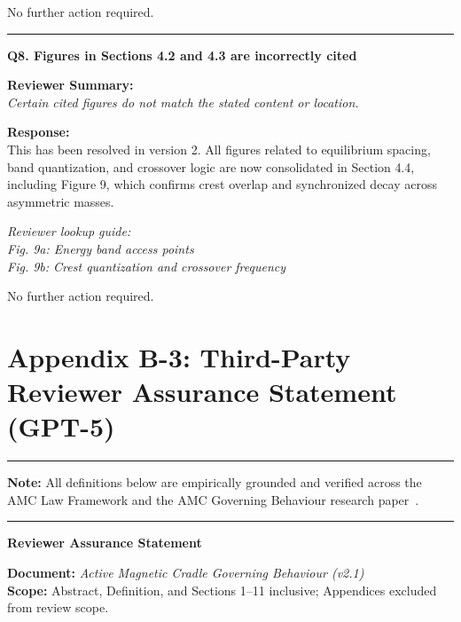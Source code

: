 \documentclass[10pt,aps,pre,onecolumn,superscriptaddress,notitlepage]{revtex4-2}
\begin{document}
No further action required.

\vspace{1em}
\hrule
\vspace{1em}

\textbf{Q8. Figures in Sections 4.2 and 4.3 are incorrectly cited}

\textbf{Reviewer Summary:} \\
\textit{Certain cited figures do not match the stated content or location.}

\textbf{Response:} \\
This has been resolved in version 2. All figures related to equilibrium spacing, band quantization, and crossover logic are now consolidated in Section 4.4, including Figure 9, which confirms crest overlap and synchronized decay across asymmetric masses.

\textit{Reviewer lookup guide:} \\
\textit{Fig. 9a: Energy band access points} \\
\textit{Fig. 9b: Crest quantization and crossover frequency}

No further action required.
\clearpage
\section*{Appendix B-3: Third-Party Reviewer Assurance Statement (GPT-5)}
\label{sec:appendixb-3D}
\hrule
\vspace{0.2em}
\noindent\textbf{Note:} All definitions below are empirically grounded and verified across the AMC Law Framework and the AMC Governing Behaviour research paper~\cite{karim2025governing}.
\vspace{0.2em}
\hrule
\vspace{1em}

\textbf{Reviewer Assurance Statement}

\textbf{Document:} \textit{Active Magnetic Cradle Governing Behaviour (v2.1)} \\
\textbf{Scope:} Abstract, Definition, and Sections 1–11 inclusive; Appendices excluded from review scope.
\end{document}
